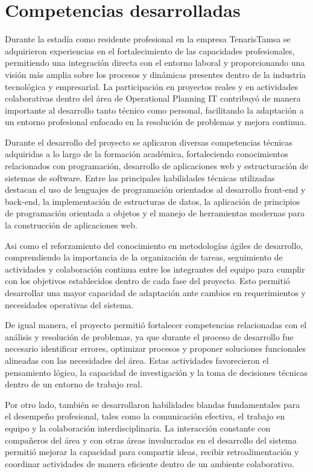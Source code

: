 \chapter*{Competencias desarrolladas}

Durante la estadía como residente profesional en la empresa TenarisTamsa se adquirieron experiencias en el fortalecimiento de las capacidades profesionales, permitiendo una integración directa con el entorno laboral y proporcionando una visión más amplia sobre los procesos y dinámicas presentes dentro de la industria tecnológica y empresarial. La participación en proyectos reales y en actividades colaborativas dentro del área de Operational Planning IT contribuyó de manera importante al desarrollo tanto técnico como personal, facilitando la adaptación a un entorno profesional enfocado en la resolución de problemas y mejora continua.

Durante el desarrollo del proyecto se aplicaron diversas competencias técnicas adquiridas a lo largo de la formación académica, fortaleciendo conocimientos relacionados con programación, desarrollo de aplicaciones web y estructuración de sistemas de software. Entre las principales habilidades técnicas utilizadas destacan el uso de lenguajes de programación orientados al desarrollo front-end y back-end, la implementación de estructuras de datos, la aplicación de principios de programación orientada a objetos y el manejo de herramientas modernas para la construcción de aplicaciones web.

Asi como el reforzamiento del conocimiento en metodologías ágiles de desarrollo, comprendiendo la importancia de la organización de tareas, seguimiento de actividades y colaboración continua entre los integrantes del equipo para cumplir con los objetivos establecidos dentro de cada fase del proyecto. Esto permitió desarrollar una mayor capacidad de adaptación ante cambios en requerimientos y necesidades operativas del sistema.

De igual manera, el proyecto permitió fortalecer competencias relacionadas con el análisis y resolución de problemas, ya que durante el proceso de desarrollo fue necesario identificar errores, optimizar procesos y proponer soluciones funcionales alineadas con las necesidades del área. Estas actividades favorecieron el pensamiento lógico, la capacidad de investigación y la toma de decisiones técnicas dentro de un entorno de trabajo real.

Por otro lado, también se desarrollaron habilidades blandas fundamentales para el desempeño profesional, tales como la comunicación efectiva, el trabajo en equipo y la colaboración interdisciplinaria. La interacción constante con compañeros del área y con otras áreas involucradas en el desarrollo del sistema permitió mejorar la capacidad para compartir ideas, recibir retroalimentación y coordinar actividades de manera eficiente dentro de un ambiente colaborativo.